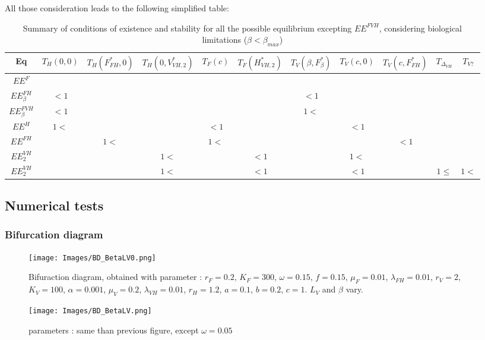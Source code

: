 \documentclass{article}
\newcommand{\lf}{\lambda_{FH}}
\newcommand{\lv}{\lambda_{VH}}
\begin{document}
All those consideration leads to the following simplified table:
\begin{table}[ht]
\centering
\caption{\centering Summary of conditions of existence and stability for all the possible equilibrium excepting $EE^{FVH}$, considering biological limitations ($\beta < \beta_{max}$)}
{\small
\begin{tabular}{c|c|c|c|c|c|c|c|c|c|c}
Eq & $T_H(0, 0)$ & $T_H(F^*_{FH}, 0)$ & $T_H(0, V^*_{VH,2})$ & $T_F(c)$& $T_F(H^*_{VH, 2})$ & $T_V(\beta, F^*_\beta)$ & $T_V(c, 0)$ & $T_V(c, F^*_{FH})$ & $T_{\Delta_{VH}}$ & $T_{V?}$  \\ \hline
$EE^F$ & & & & & & & & & & \\ \hline
$EE^{FH}_\beta$ & $<1$ & & & & & $<1$ & & & & \\ \hline
$EE^{FVH}_\beta$ & $<1$ & & & & & $1<$ & & & & \\ \hline
$EE^H $ & $1<$  & & & $<1$& & & $<1$ & & & \\ \hline
$EE^{FH} $ & & $1<$  & & $1<$ & & & & $<1$ & & \\ \hline
$EE^{VH}_2 $ & & & $1<$ & & $<1$ & & $1<$ & & & \\ \hline
$EE^{VH}_2 $ & & & $1<$ & & $<1$ & & $<1$ & &$1\leq$& $1<$ \\ \hline
\end{tabular}
}
\end{table}

\newpage

\subsection{Numerical tests}

\subsubsection{Bifurcation diagram}
\begin{figure}[!ht]
\centering
\texttt{[image: Images/BD\_BetaLV0.png]}
\caption{Bifuraction diagram, obtained with parameter : $r_F = 0.2$, $K_F=300$, $\omega=0.15$, $f=0.15$, $\mu_F=0.01$, $\lf=0.01$, $r_V=2$, $K_V=100$, $\alpha=0.001$, $\mu_V=0.2$, $\lv=0.01$, $r_H=1.2$, $a=0.1$, $b=0.2$, $c=1$. $L_V$ and $\beta$ vary.}
\end{figure}

\begin{figure}[!ht]
\centering
\texttt{[image: Images/BD\_BetaLV.png]}
\caption{parameters : same than previous figure, except $\omega = 0.05$}
\end{figure}
\end{document}
